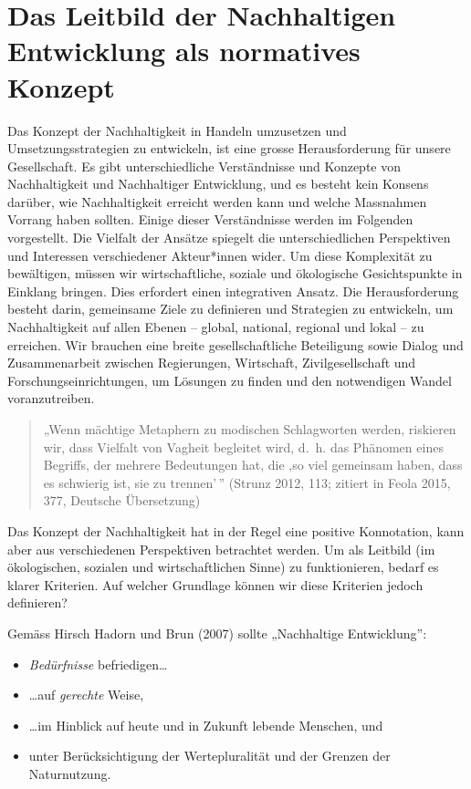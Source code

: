 \documentclass[
  nswissgerman,
  a4paper,
  DIV=11,
  numbers=noendperiod,
  oneside,
  openany]{scrreprt}
\providecommand{\tightlist}{%
  \setlength{\itemsep}{0pt}\setlength{\parskip}{0pt}}
\begin{document}
\section{Das Leitbild der Nachhaltigen Entwicklung als normatives
Konzept}\label{das-leitbild-der-nachhaltigen-entwicklung-als-normatives-konzept}

Das Konzept der Nachhaltigkeit in Handeln umzusetzen und
Umsetzungsstrategien zu entwickeln, ist eine grosse Herausforderung für
unsere Gesellschaft. Es gibt unterschiedliche Verständnisse und Konzepte
von Nachhaltigkeit und Nachhaltiger Entwicklung, und es besteht kein
Konsens darüber, wie Nachhaltigkeit erreicht werden kann und welche
Massnahmen Vorrang haben sollten. Einige dieser Verständnisse werden im
Folgenden vorgestellt. Die Vielfalt der Ansätze spiegelt die
unterschiedlichen Perspektiven und Interessen verschiedener Akteur*innen
wider. Um diese Komplexität zu bewältigen, müssen wir wirtschaftliche,
soziale und ökologische Gesichtspunkte in Einklang bringen. Dies
erfordert einen integrativen Ansatz. Die Herausforderung besteht darin,
gemeinsame Ziele zu definieren und Strategien zu entwickeln, um
Nachhaltigkeit auf allen Ebenen -- global, national, regional und lokal
-- zu erreichen. Wir brauchen eine breite gesellschaftliche Beteiligung
sowie Dialog und Zusammenarbeit zwischen Regierungen, Wirtschaft,
Zivilgesellschaft und Forschungseinrichtungen, um Lösungen zu finden und
den notwendigen Wandel voranzutreiben.

\begin{quote}
„Wenn mächtige Metaphern zu modischen Schlagworten werden, riskieren
wir, dass Vielfalt von Vagheit begleitet wird, d.~h. das Phänomen eines
Begriffs, der mehrere Bedeutungen hat, die ‚so viel gemeinsam haben,
dass es schwierig ist, sie zu trennen'\,'' (Strunz 2012, 113; zitiert in
Feola 2015, 377, Deutsche Übersetzung)
\end{quote}

Das Konzept der Nachhaltigkeit hat in der Regel eine positive
Konnotation, kann aber aus verschiedenen Perspektiven betrachtet werden.
Um als Leitbild (im ökologischen, sozialen und wirtschaftlichen Sinne)
zu funktionieren, bedarf es klarer Kriterien. Auf welcher Grundlage
können wir diese Kriterien jedoch definieren?

Gemäss Hirsch Hadorn und Brun (2007) sollte „Nachhaltige Entwicklung'':

\begin{itemize}
\tightlist
\item
  \emph{Bedürfnisse} befriedigen\ldots{}
\item
  \ldots auf \emph{gerechte} Weise,
\item
  \ldots im Hinblick auf heute und in Zukunft lebende Menschen, und
\item
  unter Berücksichtigung der Wertepluralität und der Grenzen der
  Naturnutzung.
\end{itemize}
\end{document}
